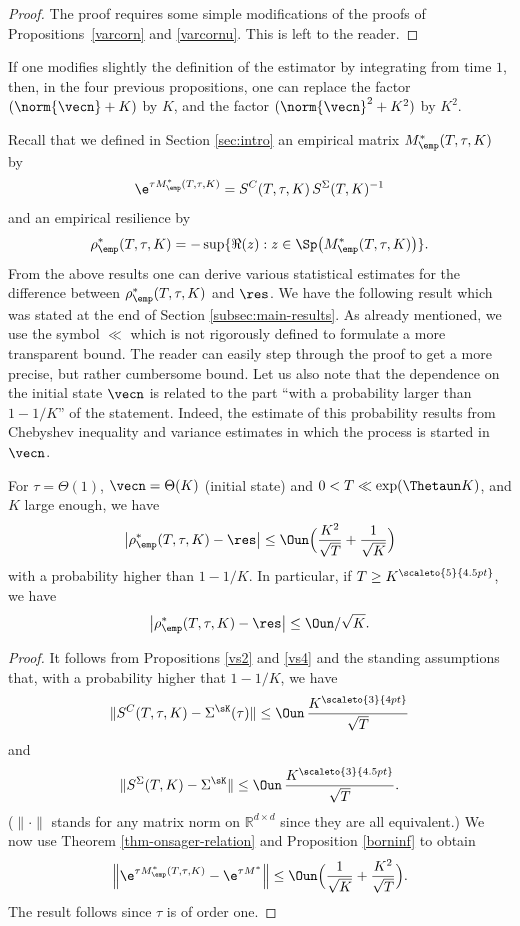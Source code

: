 \begin{proof}
The proof requires some simple modifications of the proofs of Propositions~\ref{varcorn} and \ref{varcornu}. This is left to the reader.
\end{proof}

\begin{remark}
If one modifies slightly the definition of the estimator by integrating from time $1$,
then, in the four previous propositions, one can replace the factor \hbox{$(\norm{\vecn}+K)$} by $K$, and the factor
$(\norm{\vecn}^{2}+K^2)$ by $K^2$.
\end{remark}

Recall that we defined in Section \ref{sec:intro} an empirical matrix $M^{*}_\emp(T,\tau,K)$ by
\[
\e^{\tau M^{*}_\emp(T,\tau,K)}=S^{C}(T,\tau,K)\,S^{\Sigma}(T,K)^{-1}
\]
and an empirical resilience by
\[
\rho^*_\emp(T,\tau,K)=- \sup\{ \Re (z): z\in\Sp\bigl(M^{*}_\emp(T,\tau,K)\bigr)\}.
\]
From the above results one can derive various statistical estimates for the difference between $\rho^*_\emp(T,\tau,K)$
and $\res$. We have the following result which was stated at the end of Section \ref{subsec:main-results}. As already mentioned, we
use the symbol $\ll$ which is not rigorously defined to formulate a more transparent bound.
The reader can easily step through the proof to get a more precise, but rather cumbersome bound.
Let us also note that the dependence on the initial state $\vecn$ is related to the part ``with a probability larger than
$1-1/K$'' of the statement. Indeed, the estimate of this probability results from Chebyshev inequality and variance estimates in which the process is
started in $\vecn$.

\begin{theorem}\label{rhoemp}
For $\tau=\Theta(1)$, $\vecn=\Theta(K)$ (initial state) and $0<T\ll \exp(\Thetaun K)$,
and $K$ large enough, we have
\[
\big|\rho^*_\emp(T,\tau,K)-\res\big|\le
\Oun \Bigl(\frac{K^{2}}{\sqrt{T}} +\frac{1}{\sqrt{K}} \Bigr)
\]
with a probability higher than $1-1/K$.
In particular, if $T\geq K^{\scaleto{5}{4.5pt}} $, we have
\[
\big|\rho^*_\emp(T,\tau,K)-\res\big|\leq \Oun/\sqrt{K}.
\]
\end{theorem}

\begin{proof}
It follows from Propositions \ref{vs2} and \ref{vs4} and the standing assumptions that, with a probability higher that $1-1/K$, we have
\[
\|S^{C}(T,\tau,K)-\Sigma^{\sK}(\tau)\|\leq \Oun\, \frac{K^{\scaleto{3}{4pt}}}{\sqrt{T}}
\]
and
\[
\|S^{{ \Sigma}}(T,K)-\Sigma^{\sK}\|\leq \Oun \, \frac{K^{\scaleto{3}{4.5pt}}}{\sqrt{T}}.
\]
($\|\cdot\|$ stands for any matrix norm on $\mathds{R}^{d\times d}$ since they are all equivalent.)
We now use Theorem \ref{thm-onsager-relation} and Proposition \ref{borninf} to obtain
\[
\Big\| \e^{\tau M^{*}_\emp(T,\tau,K)}-\e^{\tau M^{*}}\Big\|\leq \Oun \Bigl(\frac{1}{\sqrt{K}}+ \frac{K^2}{\sqrt{T}} \Bigr).
\]
The result follows since $\tau$ is of order one.
\end{proof}

